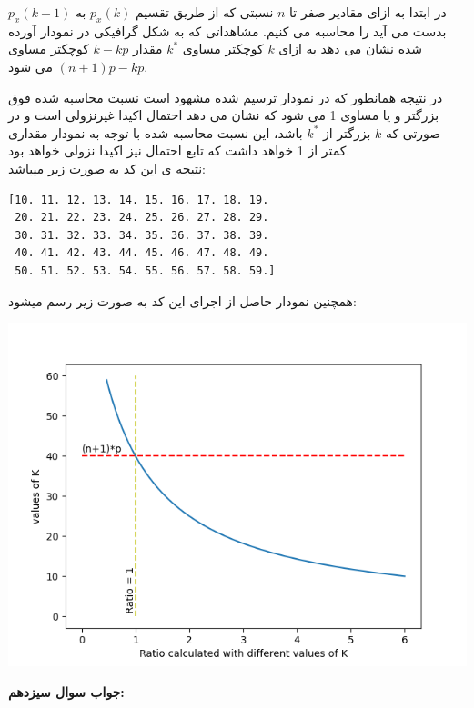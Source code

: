 \documentclass[a4paper,14pt]{article}
\begin{document}
	
	در ابتدا به ازای مقادیر صفر تا $n$ نسبتی که از طریق تقسیم $ p_x(k) $ به $ p_x(k-1) $ بدست می آید را محاسبه می کنیم. مشاهداتی که به شکل گرافیکی در نمودار آورده شده نشان می دهد به ازای $k$ کوچکتر مساوی $k^*$ مقدار $k-kp$ کوچکتر مساوی $ (n+1)p-kp $ می شود.
	
	\noindent در نتیجه همانطور که در نمودار ترسیم شده مشهود است نسبت محاسبه شده فوق بزرگتر و یا مساوی 1 می شود که نشان می دهد احتمال اکیدا غیرنزولی است و در صورتی که $k$ بزرگتر از $k^*$ باشد، این نسبت محاسبه شده با توجه به نمودار مقداری کمتر از 1 خواهد داشت که تابع احتمال نیز اکیدا نزولی خواهد بود.\\
	
	نتیجه ی این کد به صورت زیر میباشد:\\
	
	
	
	
\begin{latin}
	\begin{lstlisting}
[10. 11. 12. 13. 14. 15. 16. 17. 18. 19.
 20. 21. 22. 23. 24. 25. 26. 27. 28. 29.
 30. 31. 32. 33. 34. 35. 36. 37. 38. 39.
 40. 41. 42. 43. 44. 45. 46. 47. 48. 49.
 50. 51. 52. 53. 54. 55. 56. 57. 58. 59.]
	\end{lstlisting}
\end{latin}

همچنین نمودار حاصل از اجرای این کد به صورت زیر رسم میشود:\\

\begin{center}
	\includegraphics[width=1\textwidth]{pic4.png}
\end{center}

\textbf{جواب سوال سیزدهم:}\\
\end{document}
